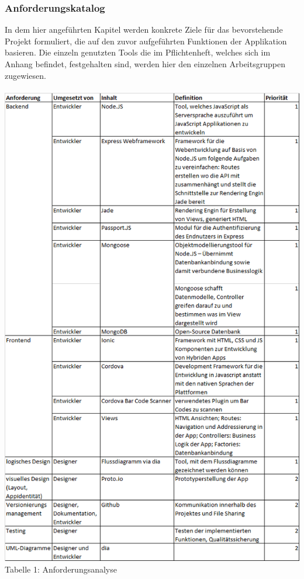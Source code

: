 \documentclass[12pt,a4paper]{article}
\begin{document}
\subsubsection{Anforderungskatalog}
In dem hier angeführten Kapitel werden konkrete Ziele für das bevorstehende Projekt formuliert, die auf den zuvor aufgeführten Funktionen der Applikation basieren.
Die einzeln genutzten Tools die im Pflichtenheft, welches sich im Anhang befindet, festgehalten sind, werden hier den einzelnen Arbeitsgruppen zugewiesen.
\\
\\
\includegraphics[scale=0.59, origin=l]{Anforderungskatalog.png}
\\
\footnotesize Tabelle 1: Anforderungsanalyse
\normalsize
\\
\linebreak
\end{document}

